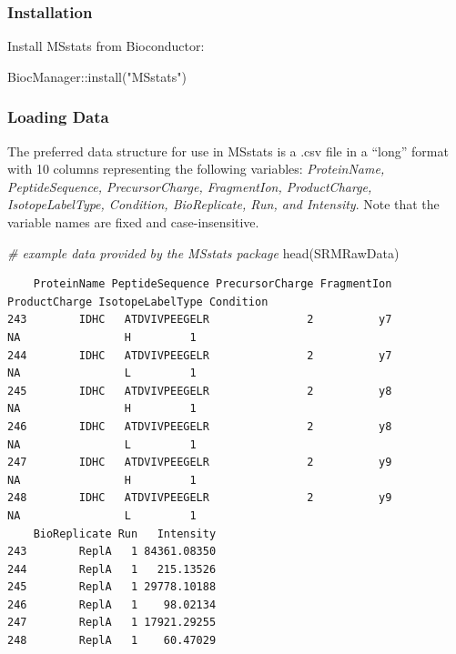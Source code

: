 \documentclass[
]{book}
\newenvironment{Shaded}{\begin{snugshade}}{\end{snugshade}}
\newcommand{\CommentTok}[1]{\textcolor[rgb]{0.56,0.35,0.01}{\textit{#1}}}
\newcommand{\FunctionTok}[1]{\textcolor[rgb]{0.00,0.00,0.00}{#1}}
\newcommand{\NormalTok}[1]{#1}
\newcommand{\SpecialCharTok}[1]{\textcolor[rgb]{0.00,0.00,0.00}{#1}}
\newcommand{\StringTok}[1]{\textcolor[rgb]{0.31,0.60,0.02}{#1}}
\begin{document}
\hypertarget{installation-3}{%
\subsubsection*{Installation}\label{installation-3}}

Install MSstats from Bioconductor:

\begin{Shaded}
\begin{Highlighting}[]
\NormalTok{BiocManager}\SpecialCharTok{::}\FunctionTok{install}\NormalTok{(}\StringTok{"MSstats"}\NormalTok{)}
\end{Highlighting}
\end{Shaded}

\hypertarget{loading-data}{%
\subsubsection*{Loading Data}\label{loading-data}}

The preferred data structure for use in MSstats is a .csv file in a ``long'' format with 10 columns representing the following variables: \emph{ProteinName, PeptideSequence, PrecursorCharge, FragmentIon, ProductCharge, IsotopeLabelType, Condition, BioReplicate, Run, and Intensity}. Note that the variable names are fixed and case-insensitive.

\begin{Shaded}
\begin{Highlighting}[]
\CommentTok{\# example data provided by the MSstats package}
\FunctionTok{head}\NormalTok{(SRMRawData)}
\end{Highlighting}
\end{Shaded}

\begin{verbatim}
    ProteinName PeptideSequence PrecursorCharge FragmentIon ProductCharge IsotopeLabelType Condition
243        IDHC   ATDVIVPEEGELR               2          y7            NA                H         1
244        IDHC   ATDVIVPEEGELR               2          y7            NA                L         1
245        IDHC   ATDVIVPEEGELR               2          y8            NA                H         1
246        IDHC   ATDVIVPEEGELR               2          y8            NA                L         1
247        IDHC   ATDVIVPEEGELR               2          y9            NA                H         1
248        IDHC   ATDVIVPEEGELR               2          y9            NA                L         1
    BioReplicate Run   Intensity
243        ReplA   1 84361.08350
244        ReplA   1   215.13526
245        ReplA   1 29778.10188
246        ReplA   1    98.02134
247        ReplA   1 17921.29255
248        ReplA   1    60.47029
\end{verbatim}
\end{document}

